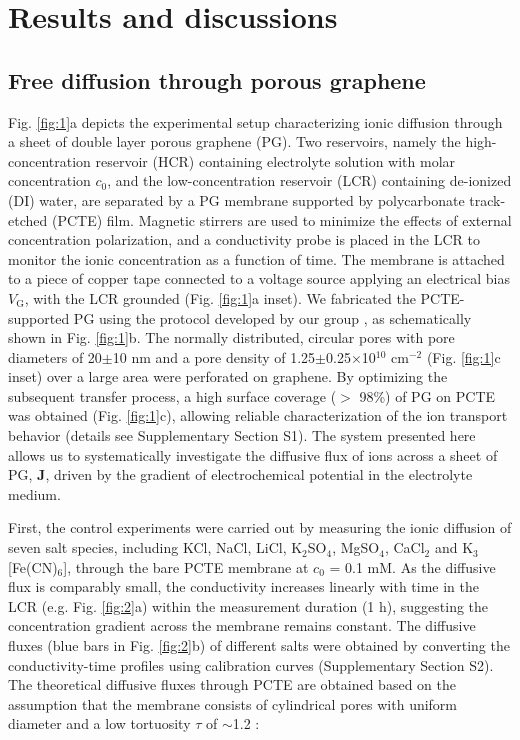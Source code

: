 \documentclass[journal=langd5,email=true, hyperref=true, keywords=false]{achemso}
\newcommand{\Fig}{Fig.}
\begin{document}
\section{Results and discussions}
\label{sec:res}

\subsection{Free diffusion through porous graphene}
\label{sec:res-1}

\Fig{} \ref{fig:1}a depicts the experimental setup characterizing
ionic diffusion through a sheet of double layer porous graphene
(PG). Two reservoirs, namely the high-concentration reservoir (HCR)
containing electrolyte solution with molar concentration $c_0$, and
the low-concentration reservoir (LCR) containing de-ionized (DI)
water, are separated by a PG membrane supported by polycarbonate
track-etched (PCTE) film. Magnetic stirrers are used to minimize the
effects of external concentration polarization, and a conductivity
probe is placed in the LCR to monitor the ionic concentration as a
function of time. The membrane is attached to a piece of copper tape
connected to a voltage source applying an electrical bias
$V_{\mathrm{G}}$, with the LCR grounded (\Fig{} \ref{fig:1}a
inset). We fabricated the PCTE-supported PG using the protocol
developed by our group \cite{Choi_2018}, as schematically shown in
\Fig{} \ref{fig:1}b. The normally distributed, circular pores with
pore diameters of 20$\pm$10 nm and a pore density of
1.25$\pm$0.25$\times$10$^{10}$ cm$^{-2}$ (\Fig{} \ref{fig:1}c inset) over a
large area were perforated on graphene.  By optimizing the subsequent
transfer process, a high surface coverage ($>$ 98\%) of PG on PCTE was
obtained (\Fig{} \ref{fig:1}c), allowing reliable characterization of
the ion transport behavior (details see Supplementary 
Section S1).  The system presented here allows us to systematically
investigate the diffusive flux of ions across a sheet of PG,
$\boldsymbol{J}$, driven by the gradient of electrochemical potential
in the electrolyte medium.

First, the control experiments were carried out by measuring the ionic
diffusion of seven salt species, including KCl, NaCl, LiCl,
K$_{2}$SO$_{4}$, MgSO$_{4}$, CaCl$_{2}$ and K$_{3}$[Fe(CN)$_{6}$],
through the bare PCTE membrane at $c_{0}$ = 0.1 mM. As the diffusive
flux is comparably small, the conductivity increases linearly with time in the LCR
(e.g. \Fig{} \ref{fig:2}a) within the measurement duration (1 h),
suggesting the concentration gradient across the membrane remains 
constant. The diffusive fluxes (blue bars in \Fig{} \ref{fig:2}b) of different salts were
obtained by converting the conductivity-time profiles using
calibration curves (Supplementary Section S2). The theoretical diffusive fluxes through PCTE are obtained based on the assumption that the
membrane consists of cylindrical pores with uniform diameter and a low
tortuosity $\tau$ of $\sim{}$1.2 \cite{O_Hern_2012}:
\end{document}
